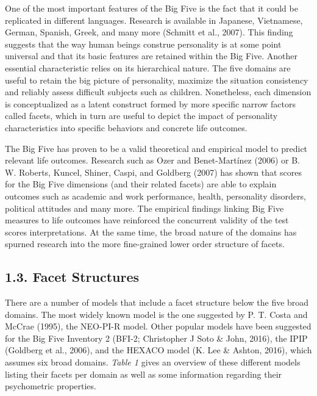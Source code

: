 \documentclass[,man,floatsintext]{apa6}
\begin{document}
One of the most important features of the Big Five is the fact that it
could be replicated in different languages. Research is available in
Japanese, Vietnamese, German, Spanish, Greek, and many more (Schmitt et
al., 2007). This finding suggests that the way human beings construe
personality is at some point universal and that its basic features are
retained within the Big Five. Another essential characteristic relies on
its hierarchical nature. The five domains are useful to retain the big
picture of personality, maximize the situation consistency and reliably
assess difficult subjects such as children. Nonetheless, each dimension
is conceptualized as a latent construct formed by more specific narrow
factors called facets, which in turn are useful to depict the impact of
personality characteristics into specific behaviors and concrete life
outcomes.

The Big Five has proven to be a valid theoretical and empirical model to
predict relevant life outcomes. Research such as Ozer and Benet-Martínez
(2006) or B. W. Roberts, Kuncel, Shiner, Caspi, and Goldberg (2007) has
shown that scores for the Big Five dimensions (and their related facets)
are able to explain outcomes such as academic and work performance,
health, personality disorders, political attitudes and many more. The
empirical findings linking Big Five measures to life outcomes have
reinforced the concurrent validity of the test scores interpretations.
At the same time, the broad nature of the domains has spurned research
into the more fine-grained lower order structure of facets.

\subsection{1.3. Facet Structures}\label{facet-structures}

There are a number of models that include a facet structure below the
five broad domains. The most widely known model is the one suggested by
P. T. Costa and McCrae (1995), the NEO-PI-R model. Other popular models
have been suggested for the Big Five Inventory 2 (BFI-2; Christopher J
Soto \& John, 2016), the IPIP (Goldberg et al., 2006), and the HEXACO
model (K. Lee \& Ashton, 2016), which assumes six broad domains.
\emph{Table 1} gives an overview of these different models listing their
facets per domain as well as some information regarding their
psychometric properties.

\vspace{5mm}
\end{document}
